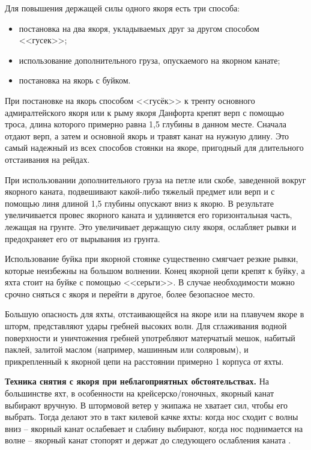 Для повышения держащей силы одного якоря есть три способа: 
\begin{itemize}
\item постановка на два якоря, укладываемых друг за другом способом <<гусек>>; 
\item использование дополнительного груза, опускаемого на якорном канате; 
\item постановка на якорь с буйком. 
\end{itemize}

При постановке на якорь способом <<гусёк>> к тренту основного адмиралтейского якоря или к рыму якоря Данфорта крепят верп с помощью троса, длина которого примерно равна 1,5 глубины в данном месте. Сначала отдают верп, а затем и основной якорь и травят канат на нужную длину. Это самый надежный из всех способов стоянки на якоре, пригодный для длительного отстаивания на рейдах.

При использовании дополнительного груза на петле или скобе, заведенной вокруг якорного каната, подвешивают какой-либо тяжелый предмет или верп и с помощью линя длиной 1,5 глубины опускают вниз к якорю. В результате увеличивается провес якорного каната и удлиняется его горизонтальная часть, лежащая на грунте. Это увеличивает держащую силу якоря, ослабляет рывки и предохраняет его от вырывания из грунта.

Использование буйка при якорной стоянке существенно смягчает резкие рывки, которые неизбежны на большом волнении. Конец якорной цепи крепят к буйку, а яхта стоит на буйке с помощью <<серьги>>. В случае необходимости можно срочно сняться с якоря и перейти в другое, более безопасное место.

Большую опасность для яхты, отстаивающейся на якоре или на плавучем якоре в шторм, представляют удары гребней высоких волн. Для сглаживания водной поверхности и уничтожения гребней употребляют матерчатый мешок, набитый паклей, залитой маслом (например, машинным или соляровым), и прикрепленный к якорной цепи на расстоянии примерно 1 корпуса от яхты. 

\textbf{Техника снятия с якоря при неблагоприятных обстоятельствах.} На большинстве яхт, в особенности на крейсерско\-/гоночных, якорный канат выбирают вручную. В штормовой ветер у экипажа не хватает сил, чтобы его выбрать. Тогда делают это в такт килевой качке яхты: когда нос сходит с волны вниз \--- якорный канат ослабевает и слабину выбирают, когда нос поднимается на волне \--- якорный канат стопорят и держат до следующего ослабления каната . 

